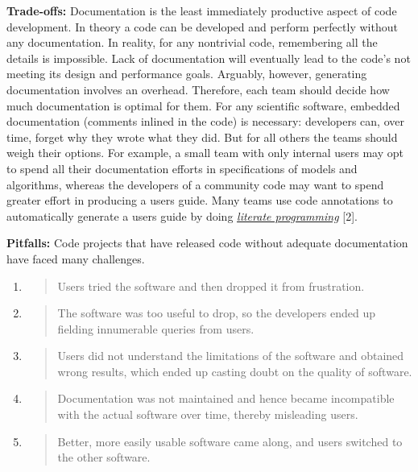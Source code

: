 \documentclass[]{article}
\begin{document}
\textbf{Trade-offs:} Documentation is the
least immediately productive aspect of code development. In theory a
code can be developed and perform perfectly without any documentation.
In reality, for any nontrivial code, remembering all the details is
impossible. Lack of documentation will eventually lead to the code's not
meeting its design and performance goals. Arguably, however, generating
documentation involves an overhead. Therefore, each team should decide
how much documentation is optimal for them. For any scientific software,
embedded documentation (comments inlined in the code) is necessary:
developers can, over time, forget why they wrote what they did. But for
all others the teams should weigh their options. For example, a small
team with only internal users may opt to spend all their documentation
efforts in specifications of models and algorithms, whereas the
developers of a community code may want to spend greater effort in
producing a users guide. Many teams use code annotations to
automatically generate a users guide by doing
\href{http://www-cs-faculty.stanford.edu/~uno/lp.html}{\emph{literate
programming}} {[}2{]}.

\textbf{Pitfalls:} Code projects that
have released code without adequate documentation have faced many
challenges.

\begin{enumerate}
\def\labelenumi{(\arabic{enumi})}
\item
  \begin{quote}
  Users tried the software and then dropped it from frustration.
  \end{quote}
\item
  \begin{quote}
  The software was too useful to drop, so the developers ended up
  fielding innumerable queries from users.
  \end{quote}
\item
  \begin{quote}
  Users did not understand the limitations of the software and obtained
  wrong results, which ended up casting doubt on the quality of
  software.
  \end{quote}
\item
  \begin{quote}
  Documentation was not maintained and hence became incompatible with
  the actual software over time, thereby misleading users.
  \end{quote}
\item
  \begin{quote}
  Better, more easily usable software came along, and users switched to
  the other software.
  \end{quote}
\end{enumerate}
\end{document}
